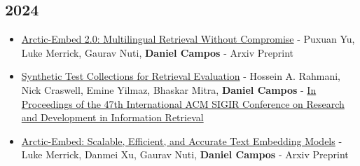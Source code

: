 \documentclass[line,margin]{res}
\begin{document}
\begin{resume}
\subsection{2024}
\begin{itemize}
    \item \href{https://arxiv.org/abs/2412.04506}{Arctic-Embed 2.0: Multilingual Retrieval Without Compromise} - Puxuan Yu, Luke Merrick, Gaurav Nuti, \textbf{Daniel Campos} - Arxiv Preprint
    \item \href{https://arxiv.org/abs/2405.07767}{Synthetic Test Collections for Retrieval Evaluation} - Hossein A. Rahmani, Nick Craswell, Emine Yilmaz, Bhaskar Mitra, \textbf{Daniel Campos} -  \href{https://sigir-2024.github.io/index.html}{In Proceedings of the 47th International ACM SIGIR Conference on Research and Development in Information Retrieval}
    \item \href{https://arxiv.org/abs/2405.05374}{Arctic-Embed: Scalable, Efficient, and Accurate Text Embedding Models} - Luke Merrick, Danmei Xu, Gaurav Nuti, \textbf{Daniel Campos} - Arxiv Preprint
\end{itemize}

\end{resume}
\end{document}
